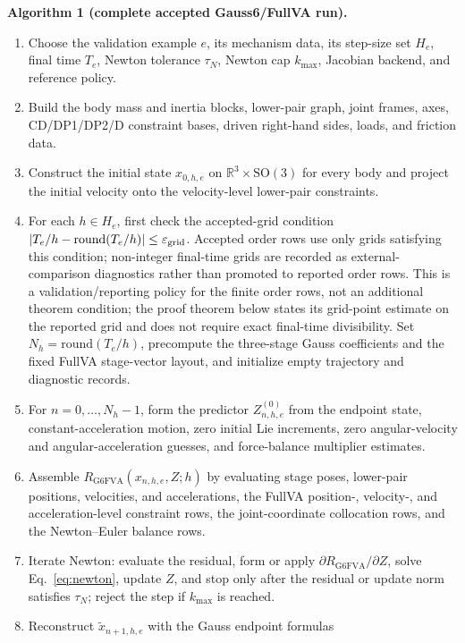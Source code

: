 \documentclass[preprint,12pt]{elsarticle}
\newcommand{\method}{Gauss6\slash FullVA}
\begin{document}
\noindent\textbf{Algorithm 1 (complete accepted \method{} run).}
\begin{enumerate}
  \item Choose the validation example $e$, its mechanism data, its step-size
  set $H_e$, final time $T_e$, Newton tolerance $\tau_N$, Newton cap
  $k_{\max}$, Jacobian backend, and reference policy.
  \item Build the body mass and inertia blocks, lower-pair graph, joint
  frames, axes, CD/DP1/DP2/D constraint bases, driven right-hand sides, loads,
  and friction data.
  \item Construct the initial state $x_{0,h,e}$ on
  $\mathbb R^3\times\mathrm{SO}(3)$ for every body and project the initial
  velocity onto the velocity-level lower-pair constraints.
  \item For each $h\in H_e$, first check the accepted-grid condition
  $|T_e/h-\mathrm{round}(T_e/h)|\le\varepsilon_{\rm grid}$. Accepted order
  rows use only grids satisfying this condition; non-integer final-time grids
  are recorded as external-comparison diagnostics rather than promoted to reported
  order rows. This is a validation/reporting policy for the finite order
  rows, not an additional theorem condition; the proof theorem below states
  its grid-point estimate on the reported grid and does not require exact
  final-time divisibility. Set $N_h=\mathrm{round}(T_e/h)$, precompute the three-stage
  Gauss coefficients and the fixed FullVA stage-vector layout, and initialize
  empty trajectory and diagnostic records.
  \item For $n=0,\ldots,N_h-1$, form the predictor $Z^{(0)}_{n,h,e}$ from the
  endpoint state, constant-acceleration motion, zero initial Lie increments,
  zero angular-velocity and angular-acceleration guesses, and force-balance
  multiplier estimates.
  \item Assemble $R_{\mathrm{G6FVA}}(x_{n,h,e},Z;h)$ by evaluating stage
  poses, lower-pair positions, velocities, and accelerations, the FullVA
  position-, velocity-, and acceleration-level constraint rows, the
  joint-coordinate collocation rows, and the Newton--Euler balance rows.
  \item Iterate Newton: evaluate the residual, form or apply
  $\partial R_{\mathrm{G6FVA}}/\partial Z$, solve
  Eq.~\eqref{eq:newton}, update $Z$, and stop only after the residual or
  update norm satisfies $\tau_N$; reject the step if $k_{\max}$ is reached.
  \item Reconstruct $\widetilde{x}_{n+1,h,e}$ with the Gauss endpoint formulas

\end{enumerate}
\end{document}
